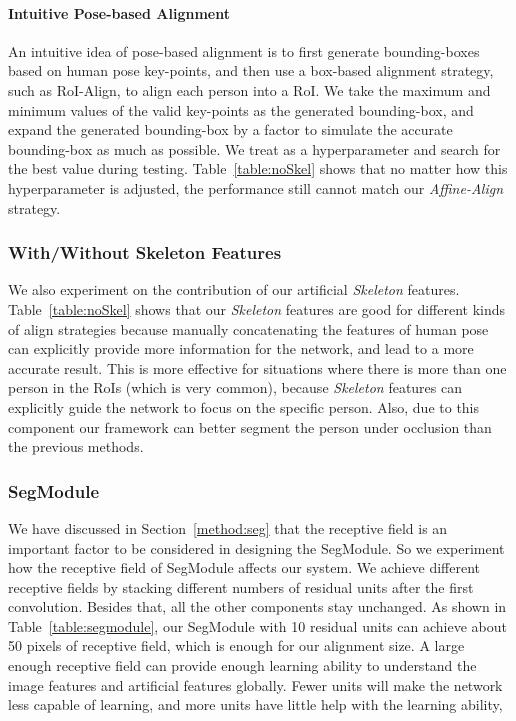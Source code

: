\documentclass[10pt,twocolumn,letterpaper]{article}
\begin{document}
\paragraph{Intuitive Pose-based Alignment}  An intuitive idea of pose-based alignment is to first generate bounding-boxes based on human pose key-points, and then use a box-based alignment strategy, such as RoI-Align, to align each person into a RoI. We take the maximum and minimum values of the valid key-points as the generated bounding-box, and expand the generated bounding-box by a factor  to simulate the accurate bounding-box as much as possible. We treat  as a hyperparameter and search for the best value during testing. Table~\ref{table:noSkel} shows that no matter how this hyperparameter  is adjusted, the performance still cannot match our \emph{Affine-Align} strategy.


\subsubsection{With/Without Skeleton Features}

We also experiment on the contribution of our artificial \emph{Skeleton} features. Table~\ref{table:noSkel} shows that our \emph{Skeleton} features are good for different kinds of align strategies because manually concatenating the features of human pose can explicitly provide more information for the network, and lead to a more accurate result. This is more effective for situations where there is more than one person in the RoIs (which is very common), because \emph{Skeleton} features can explicitly guide the network to focus on the specific person. Also, due to this component our framework can better segment the person under occlusion than the previous methods.




\subsubsection{SegModule}
\label{sec:SegModule}
We have discussed in Section~\ref{method:seg} that the receptive field is an important factor to be considered in designing the SegModule. So we experiment how the receptive field of SegModule affects our system. 
We achieve different receptive fields by stacking different numbers of residual units after the first convolution.
Besides that, all the other components stay unchanged. As shown in Table~\ref{table:segmodule}, our SegModule with 10 residual units can achieve about 50 pixels of receptive field, which is enough for our  alignment size. A large enough receptive field can provide enough learning ability to understand the image features and artificial features globally. Fewer units will make the network less capable of learning, and more units have little help with the learning ability,
\end{document}
